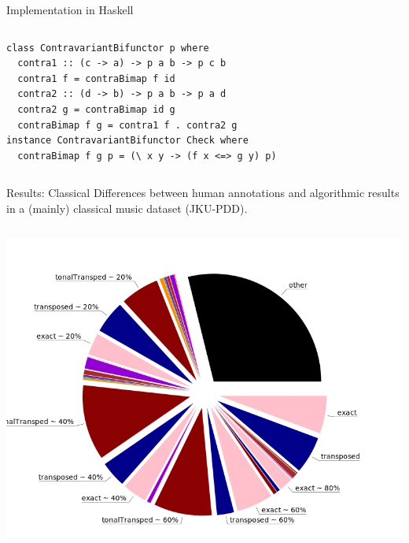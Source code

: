 \documentclass[final]{beamer}
\begin{document}
\begin{frame}[label={sec:orgd59d0ad},fragile]{}
\begin{columns}
\begin{column}[t]{0.47\columnwidth}
\begin{block}{Implementation in Haskell}
\begin{columns}
\begin{column}[T]{0.90\columnwidth}
\begin{verbatim}
class ContravariantBifunctor p where
  contra1 :: (c -> a) -> p a b -> p c b
  contra1 f = contraBimap f id
  contra2 :: (d -> b) -> p a b -> p a d
  contra2 g = contraBimap id g
  contraBimap f g = contra1 f . contra2 g
instance ContravariantBifunctor Check where
  contraBimap f g p = (\ x y -> (f x <=> g y) p)
\end{verbatim}
\end{column}
\end{columns}
\end{block}

\begin{block}{Results: Classical}
Differences between human annotations and algorithmic results in a (mainly) classical music dataset (JKU-PDD).
\vspace{-2cm}

\begin{columns}
\begin{column}[T]{0.50\columnwidth}
\small
\begin{center}
\includegraphics[width=.9\linewidth]{./img/ca.png}
\label{org69cb95a}
\end{center}
\end{column}


\end{columns}
\end{block}
\end{column}
\end{columns}
\end{frame}
\end{document}
